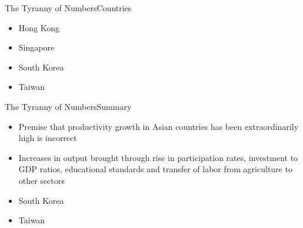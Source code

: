 \documentclass{beamer}
\begin{document}
\begin{frame}{The Tyranny of Numbers}{Countries}
\begin{itemize}
\item{Hong Kong}
\item{Singapore}
\item{South Korea}
\item{Taiwan}
\end{itemize}
\end{frame}

\begin{frame}{The Tyranny of Numbers}{Summary}
\begin{itemize}
\item{Premise that productivity growth in Asian countries has been extraordinarily high is incorrect}
\item{Increases in output brought through rise in participation rates, investment to GDP ratios, educational standards and transfer of labor from agriculture to other sectors}
\item{South Korea}
\item{Taiwan}
\end{itemize}
\end{frame}





\end{document}
